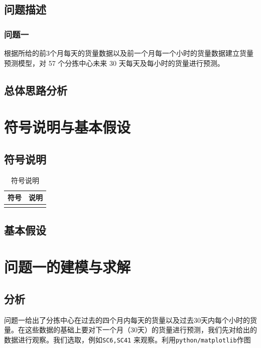 \documentclass[UTF8,a4paper,10 pt]{article}%
\begin{document}
\subsection{问题描述}
\subsubsection{问题一}
根据所给的前3个月每天的货量数据以及前一个月每一个小时的货量数据建立货量预测模型，对 57 个分拣中心未来 30 天每天及每小时的货量进行预测。


\subsection{总体思路分析}



\clearpage
\section{符号说明与基本假设}
\subsection{符号说明}

\begin{table}[!ht]
\caption{符号说明}%
\centering%
\begin{tabular}{p{4cm}<{\centering}p{8cm}<{\centering}}%
\toprule%
符号&说明 \\
\midrule%
&\\
\bottomrule%

\end{tabular}
\end{table}

\subsection{基本假设}

\clearpage
\section{问题一的建模与求解}
\subsection{分析}
问题一给出了分拣中心在过去的四个月内每天的货量以及过去30天内每个小时的货量。在这些数据的基础上要对下一个月（30天）的货量进行预测，我们先对给出的数据进行观察。我们选取，例如{\tt SC6,SC41} 来观察。利用{\tt python/matplotlib}作图
\end{document}
